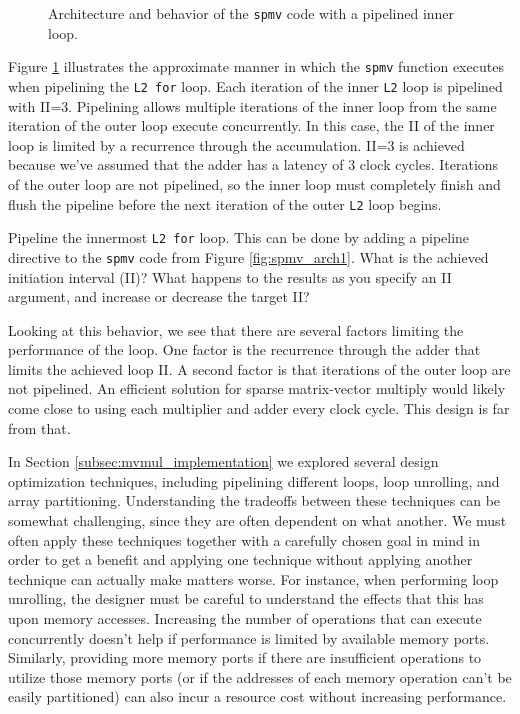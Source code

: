 \begin{figure}
\centering
{\tiny }
\caption{Architecture and behavior of the \lstinline{spmv} code with a pipelined inner loop.}
\label{fig:spmv_pipeline_inner}
\end{figure}

Figure \ref{fig:spmv_pipeline_inner} illustrates the approximate manner in which the \lstinline{spmv} function executes when pipelining the \lstinline{L2 for} loop. Each iteration of the inner \lstinline{L2} loop is pipelined with II=3.  Pipelining allows multiple iterations of the inner loop from the same iteration of the outer loop execute concurrently.  In this case, the II of the inner loop is limited by a recurrence through the accumulation.  II=3 is achieved because we've assumed that the adder has a latency of 3 clock cycles.  Iterations of the outer loop are not pipelined, so the inner loop must completely finish and flush the pipeline before the next iteration of the outer \lstinline{L2} loop begins.

\begin{exercise}
Pipeline the innermost \lstinline{L2 for} loop. This can be done by adding a pipeline directive to the \lstinline{spmv} code from Figure \ref{fig:spmv_arch1}. What is the achieved initiation interval (II)? What happens to the results as you specify an II argument, and increase or decrease the target II? 
\end{exercise}

Looking at this behavior, we see that there are several factors limiting the performance of the loop.  One factor is the recurrence through the adder that limits the achieved loop II.  A second factor is that iterations of the outer loop are not pipelined.  An efficient solution for sparse matrix-vector multiply would likely come close to using each multiplier and adder every clock cycle.  This design is far from that.

In Section \ref{subsec:mvmul_implementation} we explored several design optimization techniques, including pipelining different loops, loop unrolling, and array partitioning.  Understanding the tradeoffs between these techniques can be somewhat challenging, since they are often dependent on what another.  We must often apply these techniques together with a carefully chosen goal in mind in order to get a benefit and applying one technique without applying another technique can actually make matters worse.  For instance, when performing loop unrolling, the designer must be careful to understand the effects that this has upon memory accesses. Increasing the number of operations that can execute concurrently doesn't help if performance is limited by available memory ports.  Similarly, providing more memory ports if there are insufficient operations to utilize those memory ports (or if the addresses of each memory operation can't be easily partitioned) can also incur a resource cost without increasing performance.   


